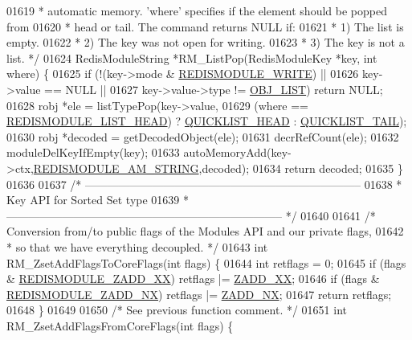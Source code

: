 \begin{DoxyCode}
{{{01619 \textcolor{comment}{ * automatic memory. 'where' specifies if the element should be popped from}
01620 \textcolor{comment}{ * head or tail. The command returns NULL if:}
01621 \textcolor{comment}{ * 1) The list is empty.}
01622 \textcolor{comment}{ * 2) The key was not open for writing.}
01623 \textcolor{comment}{ * 3) The key is not a list. */}
01624 RedisModuleString *RM\_ListPop(RedisModuleKey *key, \textcolor{keywordtype}{int} where) \{
01625     \textcolor{keywordflow}{if} (!(key->mode & \hyperlink{redismodule_8h_a73b37117ef94cb4a904361afcc51b6b4}{REDISMODULE\_WRITE}) ||
01626         key->value == NULL ||
01627         key->value->type != \hyperlink{server_8h_a4a5f22a280949c97a0cb0d4213275126}{OBJ\_LIST}) \textcolor{keywordflow}{return} NULL;
01628     robj *ele = listTypePop(key->value,
01629         (where == \hyperlink{redismodule_8h_a6ca6298fda4f019c7585d34b870fd5f1}{REDISMODULE\_LIST\_HEAD}) ? 
      \hyperlink{quicklist_8h_a4cbe05838d62e8d1c8bfa46c9f1b083a}{QUICKLIST\_HEAD} : \hyperlink{quicklist_8h_a602bad1be3a6abb2a66ef87387cb7698}{QUICKLIST\_TAIL});
01630     robj *decoded = getDecodedObject(ele);
01631     decrRefCount(ele);
01632     moduleDelKeyIfEmpty(key);
01633     autoMemoryAdd(key->ctx,\hyperlink{module_8c_a566ace39ef8d3d16c3f7d9d6c6b8e4ef}{REDISMODULE\_AM\_STRING},decoded);
01634     \textcolor{keywordflow}{return} decoded;
01635 \}
01636 
01637 \textcolor{comment}{/* --------------------------------------------------------------------------}
01638 \textcolor{comment}{ * Key API for Sorted Set type}
01639 \textcolor{comment}{ * -------------------------------------------------------------------------- */}
01640 
01641 \textcolor{comment}{/* Conversion from/to public flags of the Modules API and our private flags,}
01642 \textcolor{comment}{ * so that we have everything decoupled. */}
01643 \textcolor{keywordtype}{int} RM\_ZsetAddFlagsToCoreFlags(\textcolor{keywordtype}{int} flags) \{
01644     \textcolor{keywordtype}{int} retflags = 0;
01645     \textcolor{keywordflow}{if} (flags & \hyperlink{redismodule_8h_a90fbeee986d1f2d7288399c8304e5b06}{REDISMODULE\_ZADD\_XX}) retflags |= \hyperlink{server_8h_a4bc45df3143a1110ca9b8a67d25f47eb}{ZADD\_XX};
01646     \textcolor{keywordflow}{if} (flags & \hyperlink{redismodule_8h_a8de0369fb71791fe42d5ec6d8959bd0d}{REDISMODULE\_ZADD\_NX}) retflags |= \hyperlink{server_8h_a708539c0c5926d4c12c4bb2bb45513b2}{ZADD\_NX};
01647     \textcolor{keywordflow}{return} retflags;
01648 \}
01649 
01650 \textcolor{comment}{/* See previous function comment. */}
01651 \textcolor{keywordtype}{int} RM\_ZsetAddFlagsFromCoreFlags(\textcolor{keywordtype}{int} flags) \{
}}}
\end{DoxyCode}
